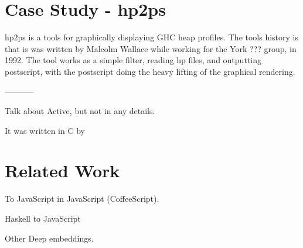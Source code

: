 \documentclass{llncs}
\begin{document}
\section{Case Study - hp2ps}

hp2ps is a tools for graphically displaying GHC heap profiles.
The tools history is that is was written by Malcolm Wallace while working
for the York ??? group, in 1992. The tool works as a simple filter,
reading hp files, and outputting postscript, with the postscript
doing the heavy lifting of the graphical rendering.

-----------

Talk about Active, but not in any details.


 It was written
in C by 

\section{Related Work}

To JavaScript in JavaScript (CoffeeScript).

Haskell to JavaScript

Other Deep embeddings.

%
%
\end{document}
